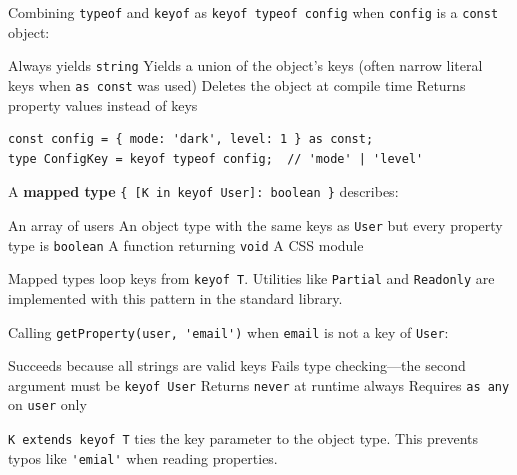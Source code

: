 \question[4]
Combining \lstinline[style=tsinline]|typeof| and \lstinline[style=tsinline]|keyof| as \lstinline[style=tsinline]|keyof typeof config| when \lstinline[style=tsinline]|config| is a \lstinline[style=tsinline]|const| object:
\begin{choices}
  \choice Always yields \lstinline[style=tsinline]|string|
  \CorrectChoice Yields a union of the object's keys (often narrow literal keys when \lstinline[style=tsinline]|as const| was used)
  \choice Deletes the object at compile time
  \choice Returns property values instead of keys
\end{choices}
\begin{solution}
\begin{lstlisting}[style=ts]
const config = { mode: 'dark', level: 1 } as const;
type ConfigKey = keyof typeof config;  // 'mode' | 'level'
\end{lstlisting}
\end{solution}

\question[4]
A \textbf{mapped type} \lstinline[style=tsinline]|{ [K in keyof User]: boolean }| describes:
\begin{choices}
  \choice An array of users
  \CorrectChoice An object type with the same keys as \lstinline[style=tsinline]|User| but every property type is \lstinline[style=tsinline]|boolean|
  \choice A function returning \lstinline[style=tsinline]|void|
  \choice A CSS module
\end{choices}
\begin{solution}
  Mapped types loop keys from \lstinline[style=tsinline]|keyof T|. Utilities like \lstinline[style=tsinline]|Partial| and \lstinline[style=tsinline]|Readonly| are implemented with this pattern in the standard library.
\end{solution}

\question[4]
Calling \lstinline[style=tsinline]|getProperty(user, 'email')| when \lstinline[style=tsinline]|email| is not a key of \lstinline[style=tsinline]|User|:
\begin{choices}
  \choice Succeeds because all strings are valid keys
  \CorrectChoice Fails type checking---the second argument must be \lstinline[style=tsinline]|keyof User|
  \choice Returns \lstinline[style=tsinline]|never| at runtime always
  \choice Requires \lstinline[style=tsinline]|as any| on \lstinline[style=tsinline]|user| only
\end{choices}
\begin{solution}
  \lstinline[style=tsinline]|K extends keyof T| ties the key parameter to the object type. This prevents typos like \lstinline[style=tsinline]|'emial'| when reading properties.
\end{solution}

